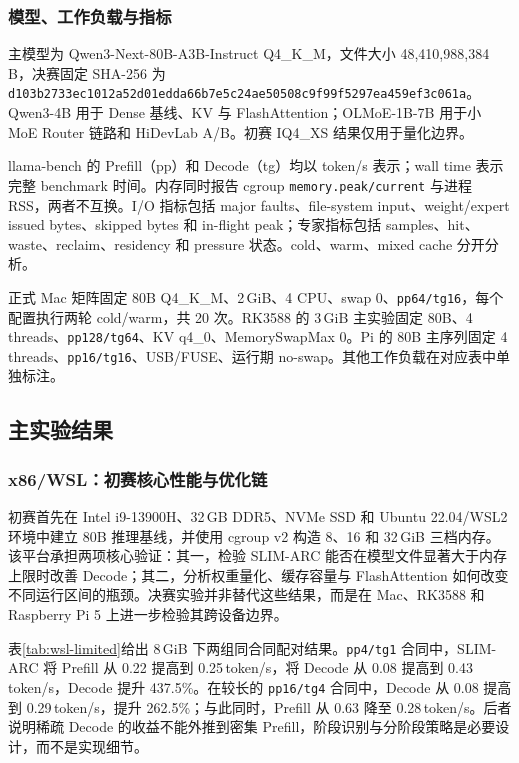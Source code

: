 \subsubsection{模型、工作负载与指标}

主模型为 Qwen3-Next-80B-A3B-Instruct Q4\_K\_M，文件大小 48,410,988,384\,B，决赛固定 SHA-256 为 \texttt{d103b2733ec1012a52d01edda66b7e5c24ae50508c9f99f5297ea459ef3c061a}。Qwen3-4B 用于 Dense 基线、KV 与 FlashAttention；OLMoE-1B-7B 用于小 MoE Router 链路和 HiDevLab A/B。初赛 IQ4\_XS 结果仅用于量化边界。

llama-bench 的 Prefill（pp）和 Decode（tg）均以 token/s 表示；wall time 表示完整 benchmark 时间。内存同时报告 cgroup \texttt{memory.peak/current} 与进程 RSS，两者不互换。I/O 指标包括 major faults、file-system input、weight/expert issued bytes、skipped bytes 和 in-flight peak；专家指标包括 samples、hit、waste、reclaim、residency 和 pressure 状态。cold、warm、mixed cache 分开分析。

正式 Mac 矩阵固定 80B Q4\_K\_M、2\,GiB、4 CPU、swap 0、\texttt{pp64/tg16}，每个配置执行两轮 cold/warm，共 20 次。RK3588 的 3\,GiB 主实验固定 80B、4 threads、\texttt{pp128/tg64}、KV q4\_0、MemorySwapMax 0。Pi 的 80B 主序列固定 4 threads、\texttt{pp16/tg16}、USB/FUSE、运行期 no-swap。其他工作负载在对应表中单独标注。

\subsection{主实验结果}

\subsubsection{x86/WSL：初赛核心性能与优化链}

初赛首先在 Intel i9-13900H、32\,GB DDR5、NVMe SSD 和 Ubuntu 22.04/WSL2 环境中建立 80B 推理基线，并使用 cgroup v2 构造 8、16 和 32\,GiB 三档内存。该平台承担两项核心验证：其一，检验 SLIM-ARC 能否在模型文件显著大于内存上限时改善 Decode；其二，分析权重量化、缓存容量与 FlashAttention 如何改变不同运行区间的瓶颈。决赛实验并非替代这些结果，而是在 Mac、RK3588 和 Raspberry Pi 5 上进一步检验其跨设备边界。

表\ref{tab:wsl-limited}给出 8\,GiB 下两组同合同配对结果。\texttt{pp4/tg1} 合同中，SLIM-ARC 将 Prefill 从 0.22 提高到 0.25\,token/s，将 Decode 从 0.08 提高到 0.43\,token/s，Decode 提升 437.5\%。在较长的 \texttt{pp16/tg4} 合同中，Decode 从 0.08 提高到 0.29\,token/s，提升 262.5\%；与此同时，Prefill 从 0.63 降至 0.28\,token/s。后者说明稀疏 Decode 的收益不能外推到密集 Prefill，阶段识别与分阶段策略是必要设计，而不是实现细节。

